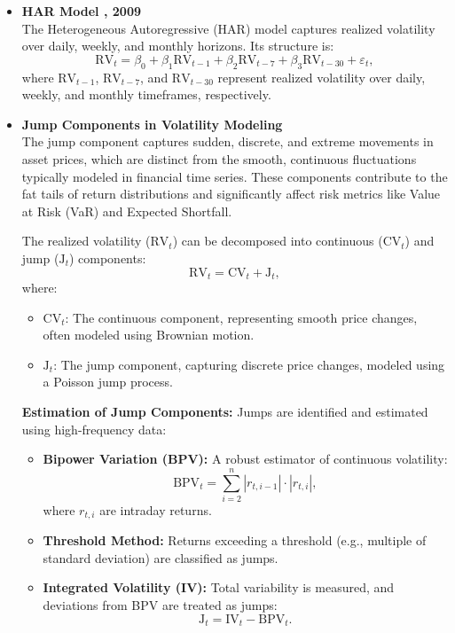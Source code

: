 
\begin{itemize}
    \item \textbf{HAR Model \cite{corsi2009}, 2009} \\
    The Heterogeneous Autoregressive (HAR) model captures realized volatility over daily, weekly, and monthly horizons. Its structure is:
    \begin{equation}\label{har-formula}
        \text{RV}_t = \beta_0 + \beta_1 \text{RV}_{t-1} + \beta_2 \text{RV}_{t-7} + \beta_3 \text{RV}_{t-30} + \varepsilon_t,
    \end{equation}
    where \(\text{RV}_{t-1}\), \(\text{RV}_{t-7}\), and \(\text{RV}_{t-30}\) represent realized volatility over daily, weekly, and monthly timeframes, respectively.

    \item \textbf{Jump Components in Volatility Modeling} \\
    The jump component captures sudden, discrete, and extreme movements in asset prices, which are distinct from the smooth, continuous fluctuations typically modeled in financial time series. These components contribute to the fat tails of return distributions and significantly affect risk metrics like Value at Risk (VaR) and Expected Shortfall.

    The realized volatility (\(\text{RV}_t\)) can be decomposed into continuous (\(\text{CV}_t\)) and jump (\(\text{J}_t\)) components:
    \[
    \text{RV}_t = \text{CV}_t + \text{J}_t,
    \]
    where:
    \begin{itemize}
        \item \(\text{CV}_t\): The continuous component, representing smooth price changes, often modeled using Brownian motion.
        \item \(\text{J}_t\): The jump component, capturing discrete price changes, modeled using a Poisson jump process.
    \end{itemize}

    \textbf{Estimation of Jump Components:}
    Jumps are identified and estimated using high-frequency data:
    \begin{itemize}
        \item \textbf{Bipower Variation (BPV):} A robust estimator of continuous volatility:
        \[
        \text{BPV}_t = \sum_{i=2}^n |r_{t,i-1}| \cdot |r_{t,i}|,
        \]
        where \(r_{t,i}\) are intraday returns.
        \item \textbf{Threshold Method:} Returns exceeding a threshold (e.g., multiple of standard deviation) are classified as jumps.
        \item \textbf{Integrated Volatility (IV):} Total variability is measured, and deviations from BPV are treated as jumps:
        \[
        \text{J}_t = \text{IV}_t - \text{BPV}_t.
        \]
    \end{itemize}


\end{itemize}
